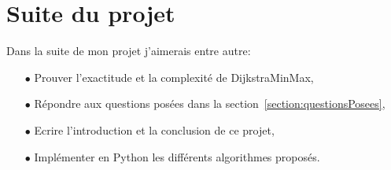 

\section{Suite du projet}

Dans la suite de mon projet j'aimerais entre autre:

\begin{enumerate}
	\item[$\bullet$] Prouver l'exactitude et la complexité de DijkstraMinMax,
	\item[$\bullet$] Répondre aux questions posées dans la section~\ref{section:questionsPosees},
	\item[$\bullet$] Ecrire l'introduction et la conclusion de ce projet,
	\item[$\bullet$] Implémenter en Python les différents algorithmes proposés.
\end{enumerate}